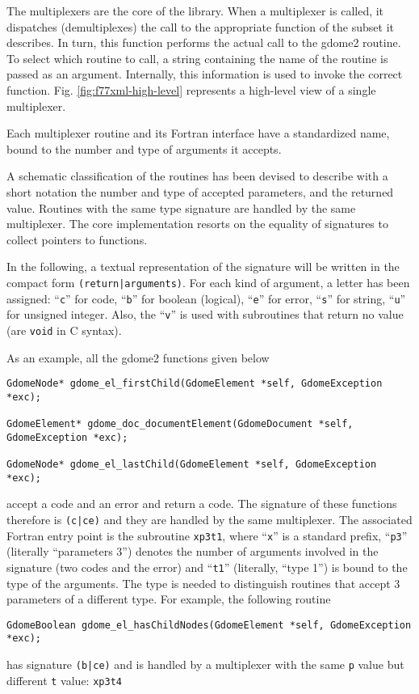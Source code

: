 The multiplexers are the core of the library. When a multiplexer is
called, it dispatches (demultiplexes) the call to the appropriate function
of the subset it describes. In turn, this function performs the actual call
to the gdome2 routine. To select which routine to call, a string containing
the name of the routine is passed as an argument. Internally, this information
is used to invoke the correct function.  Fig. \ref{fig:f77xml-high-level}
represents a high-level view of a single multiplexer. 

Each multiplexer routine and its Fortran interface have a standardized name,
bound to the number and type of arguments it accepts.

A schematic classification of the routines has been devised to describe with
a short notation the number and type of accepted parameters, and the
returned value.  Routines with the same type signature are handled by the
same multiplexer.  The core implementation resorts on the equality of
signatures to collect pointers to functions. 

In the following, a textual representation of the signature will be written
in the compact form \texttt{(return|arguments)}.  For each kind of argument,
a letter has been assigned: ``\texttt{c}'' for code, ``\texttt{b}'' for
boolean (logical), ``\texttt{e}'' for error, ``\texttt{s}'' for string,
``\texttt{u}'' for unsigned integer.  Also, the ``\texttt{v}'' is used with
subroutines that return no value (are \texttt{void} in C syntax). 

As an example, all the gdome2 functions given below

{
\footnotesize
\begin{verbatim}
GdomeNode* gdome_el_firstChild(GdomeElement *self, GdomeException *exc);

GdomeElement* gdome_doc_documentElement(GdomeDocument *self, GdomeException *exc);

GdomeNode* gdome_el_lastChild(GdomeElement *self, GdomeException *exc);
\end{verbatim}
}
accept a code and an error and return a code. The signature of these
functions therefore is \texttt{(c|ce)} and they are handled by the
same multiplexer.  The associated Fortran entry point is the subroutine
\texttt{xp3t1}, where ``\texttt{x}'' is a standard prefix, ``\texttt{p3}''
(literally ``parameters 3'') denotes the number of arguments involved in the
signature (two codes and the error) and ``\texttt{t1}'' (literally, ``type
1'') is bound to the type of the arguments.  The type is needed to
distinguish routines that accept 3 parameters of a different type.  For
example, the following routine 

{
\footnotesize
\begin{verbatim}
GdomeBoolean gdome_el_hasChildNodes(GdomeElement *self, GdomeException *exc);
\end{verbatim}
}
has signature \texttt{(b|ce)} and is handled by a multiplexer with the same
\texttt{p} value but different \texttt{t} value: \texttt{xp3t4}

